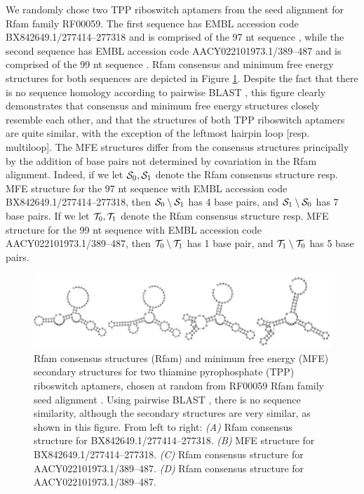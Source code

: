 We randomly chose two TPP riboswitch
aptamers from the seed alignment for
Rfam family RF00059. The first sequence has EMBL accession code
BX842649.1/277414--277318 and is comprised of the 97 nt sequence
, while the second sequence
has EMBL accession code AACY022101973.1/389--487 and is comprised of the 99
nt sequence
.
Rfam consensus and minimum free energy structures for both sequences are
depicted in Figure \ref{fig:fftbor:tppConsensusAndMfe}.
Despite the fact that there is no sequence homology according to
pairwise BLAST \cite{blast}, this figure clearly demonstrates that
consensus and
minimum free energy structures closely resemble each other, and that the
structures of both TPP riboswitch aptamers are quite similar, with the
exception of the leftmost hairpin loop [resp. multiloop].
The MFE structures differ
from the consensus structures principally by the addition of base pairs not
determined by covariation in the Rfam alignment.
Indeed, if we let $\mathcal S_0,\mathcal S_1$
denote the Rfam consensus structure resp. MFE structure for the 97 nt
sequence with EMBL accession code BX842649.1/277414--277318, then
$\mathcal S_0 \setminus \mathcal S_1$ has 4 base pairs, and $\mathcal S_1 \setminus \mathcal S_0$
 has 7
base pairs. If we let $\mathcal T_0,\mathcal T_1$
denote the Rfam consensus structure resp. MFE structure for the 99 nt
sequence with EMBL accession code
AACY022101973.1/389--487, then
$\mathcal T_0 \setminus \mathcal T_1$ has 1 base pair, and $\mathcal T_1 \setminus \mathcal T_0$ has 5
base pairs.

\begin{figure}[!ht]
\centering
\includegraphics[width=.9\textwidth]{Figures/FFTbor/tppConsensusAndMfe.pdf}
\caption{Rfam consensus structures (Rfam) and minimum free energy (MFE)
secondary structures for two thiamine pyrophosphate (TPP) riboswitch aptamers,
chosen at random from RF00059 Rfam family seed alignment
\cite{Gardner.nar11}. Using pairwise BLAST \cite{blast}, there is no
sequence similarity, although the secondary structures are very similar,
as shown in this figure. From left to right:
{\em (A)} Rfam consensus structure for BX842649.1/277414--277318.
{\em (B)} MFE structure for BX842649.1/277414--277318.
{\em (C)} Rfam consensus structure for AACY022101973.1/389--487.
{\em (D)} Rfam consensus structure for AACY022101973.1/389--487.
}
\label{fig:fftbor:tppConsensusAndMfe}
\end{figure}

